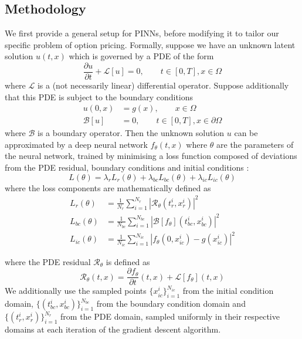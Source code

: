 \subsection{Methodology}
We first provide a general setup for PINNs, before modifying it to tailor our specific problem of option pricing. Formally, suppose we have an unknown latent solution $u(t, x)$ which is governed by a PDE of the form
\begin{equation}
    \frac{\partial u}{\partial t} + \mathcal L[u] = 0, \qquad t \in [0, T], x \in \Omega
\end{equation}
where $\mathcal L$ is a (not necessarily linear) differential operator. Suppose additionally that this PDE is subject to the boundary conditions
\begin{align}
    u(0, x) &= g(x), \qquad x \in \Omega \\
    \mathcal B[u] &= 0, \qquad t \in [0, T], x \in \partial \Omega
\end{align}
where $\mathcal B$ is a boundary operator. Then the unknown solution $u$ can be approximated by a deep neural network $f_\theta(t, x)$ where $\theta$ are the parameters of the neural network, trained by minimising a loss function composed of deviations from the PDE residual, boundary conditions and initial conditions \cite{wang2023expert}:
\begin{equation}
    L(\theta) = \lambda_{r}L_{r}(\theta) + \lambda_{bc}L_{bc}(\theta) + \lambda_{ic}L_{ic}(\theta)
\end{equation}
where the loss components are mathematically defined as
\begin{align}
    L_{r}(\theta) &= \frac{1}{N_r}\sum_{i=1}^{N_r} \left| \mathcal R_\theta(t_r^i, x_r^i) \right|^2 \\
    L_{bc}(\theta) &= \frac{1}{N_{bc}} \sum_{i=1}^{N_{bc}} \left| \mathcal B[f_\theta](t_{bc}^i, x_{bc}^i) \right|^2 \\
    L_{ic}(\theta) &= \frac{1}{N_{ic}} \sum_{i=1}^{N_{ic}} \left| f_\theta(0, x_{ic}^i) - g(x_{ic}^i) \right|^2
\end{align}

where the PDE residual $\mathcal R_\theta$ is defined as
\begin{equation}
    \mathcal R_\theta(t, x) = \frac{\partial f_\theta}{\partial t}(t, x) + \mathcal L[f_\theta](t, x)
\label{eq:pde_residual}
\end{equation}
We additionally use the sampled points $\{x_{ic}^i\}_{i=1}^{N_{ic}}$ from the initial condition domain, $\{(t_{bc}^i, x_{bc}^i)\}_{i=1}^{N_{bc}}$ from the boundary condition domain and $\{(t_r^i, x_r^i)\}_{i=1}^{N_r}$ from the PDE domain, sampled uniformly in their respective domains at each iteration of the gradient descent algorithm.

